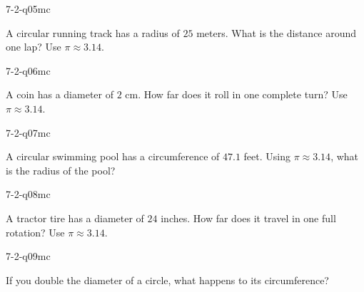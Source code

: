 \begin{practiceQuestion}{7-2-q05}{mc}
\begin{questionText}
A circular running track has a radius of $25$ meters. What is the distance around one lap? Use $\pi \approx 3.14$.
\end{questionText}
\end{practiceQuestion}

\begin{practiceQuestion}{7-2-q06}{mc}
\begin{questionText}
A coin has a diameter of $2$ cm. How far does it roll in one complete turn? Use $\pi \approx 3.14$.
\end{questionText}
\end{practiceQuestion}

\begin{practiceQuestion}{7-2-q07}{mc}
\begin{questionText}
A circular swimming pool has a circumference of $47.1$ feet. Using $\pi \approx 3.14$, what is the radius of the pool?
\end{questionText}
\end{practiceQuestion}

\begin{practiceQuestion}{7-2-q08}{mc}
\begin{questionText}
A tractor tire has a diameter of $24$ inches. How far does it travel in one full rotation? Use $\pi \approx 3.14$.
\end{questionText}
\end{practiceQuestion}

\begin{practiceQuestion}{7-2-q09}{mc}
\begin{questionText}
If you double the diameter of a circle, what happens to its circumference?
\end{questionText}
\end{practiceQuestion}

